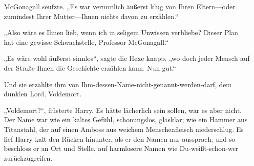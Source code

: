McGonagall seufzte. „Es war vermutlich äußerst klug von Ihren Eltern—oder zumindest Ihrer Mutter—Ihnen nichts davon zu erzählen.“

„Also wäre es Ihnen lieb, wenn ich in seligem Unwissen verbliebe? Dieser Plan hat eine gewisse Schwachstelle, Professor McGonagall.“

„Es wäre wohl äußerst sinnlos“, sagte die Hexe knapp, „wo doch jeder Mensch auf der Straße Ihnen die Geschichte erzählen kann. Nun gut.“

Und sie erzählte ihm von Ihm-dessen-Name-nicht-genannt-werden-darf, dem dunklen Lord, Voldemort.

„Voldemort?“, flüsterte Harry. Es hätte lächerlich sein sollen, war es aber nicht. Der Name war wie ein kaltes Gefühl, schonungslos, glasklar; wie ein Hammer aus Titanstahl, der auf einen Amboss aus weichem Menschenfleisch niederschlug. Es lief Harry kalt den Rücken hinunter, als er den Namen nur aussprach, und so beschloss er an Ort und Stelle, auf harmlosere Namen wie Du-weißt-schon-wer zurückzugreifen.

